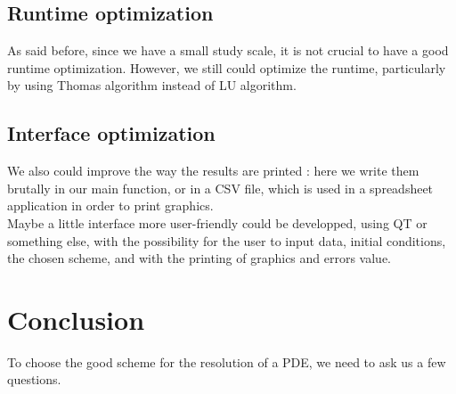 \documentclass{article}
\begin{document}
        \subsection{Runtime optimization}
            As said before, since we have a small study scale, it is not crucial to have a good
            runtime optimization. However, we still could optimize the runtime, particularly
            by using Thomas algorithm instead of LU algorithm.
        \subsection{Interface optimization}
            We also could improve the way the results are printed : here we write them brutally
            in our main function, or in a CSV file, which is used in a spreadsheet application
            in order to print graphics.
            \\
            Maybe a little interface more user-friendly could be developped, using QT or something
            else, with the possibility for the user to input data, initial conditions, the chosen
            scheme, and with the printing of graphics and errors value.

    \newpage
    \section{Conclusion}

        To choose the good scheme for the resolution of a PDE, we need to ask us a few questions.

    \newpage
\end{document}
